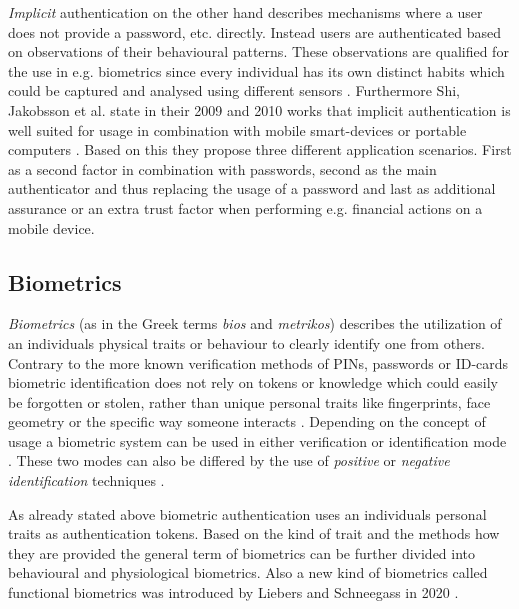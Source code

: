 \textit{Implicit} authentication on the other hand describes mechanisms where a user does not provide a password, etc. directly.
Instead users are authenticated based on observations of their behavioural patterns\cite{jakobsson2009implicit}.
These observations are qualified for the use in e.g. biometrics since every individual has its own distinct habits which could be captured and analysed using different sensors \cite{shi2010implicit}.
Furthermore Shi, Jakobsson et al. state in their 2009 and 2010 works that implicit authentication is well suited for usage in combination with mobile smart-devices \cite{shi2010implicit} or portable computers \cite{jakobsson2009implicit}.
Based on this they propose three different application scenarios.
First as a second factor in combination with passwords, second as the main authenticator and thus replacing the usage of a password and last as additional assurance or an extra trust factor when performing e.g. financial actions on a mobile device.

\subsection{Biometrics}
\textit{Biometrics} (as in the Greek terms \textit{bios} and \textit{metrikos}) describes the utilization of an individuals physical traits or behaviour to clearly identify one from others. Contrary to the more known verification methods of PINs, passwords or ID-cards biometric identification does not rely on tokens or knowledge which could easily be forgotten or stolen, rather than unique personal traits like fingerprints, face geometry or the specific way someone interacts \cite[chpt. 1.1]{jain2007handbook}\cite{delac2004survey}.
Depending on the concept of usage a biometric system can be used in either verification or identification mode \cite[chpt. 1.3]{jain2007handbook}.
These two modes can also be differed by the use of \textit{positive} or \textit{negative identification} techniques \cite{wayman2005introduction}.

As already stated above biometric authentication uses an individuals personal traits as authentication tokens. Based on the kind of trait and the methods how they are provided the general term of biometrics can be further divided into behavioural and physiological biometrics.
Also a new kind of biometrics called functional biometrics was introduced by Liebers and Schneegass in 2020 \cite{schneegass2020functbiometric}.

